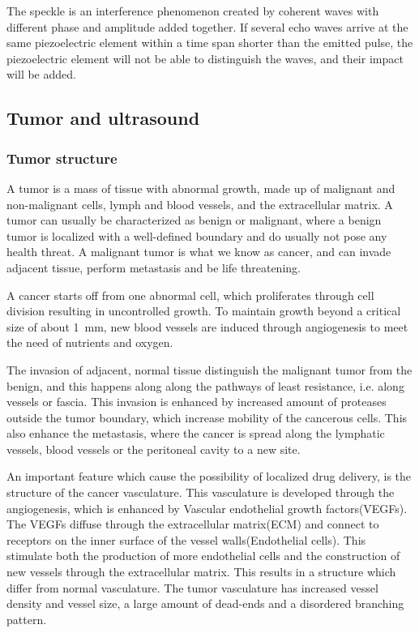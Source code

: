 The speckle is an interference phenomenon created by coherent waves with different phase and amplitude added together. If several echo waves arrive at the same piezoelectric element within a time span shorter than the emitted pulse, the piezoelectric element will not be able to distinguish the waves, and their impact will be added. 

\subsection{Tumor and ultrasound}
\subsubsection{Tumor structure}

 A tumor is a mass of tissue with abnormal growth, made up of malignant and non-malignant cells, lymph and blood vessels, and the extracellular matrix. A tumor can usually be characterized as benign or malignant, where a benign tumor is localized with a well-defined boundary and do usually not pose any health threat. A malignant tumor is what we know as cancer, and can invade adjacent tissue, perform metastasis and be life threatening. 

A cancer starts off from one abnormal cell, which proliferates through cell division resulting in uncontrolled growth. To maintain growth beyond a critical size of about \SI{1}{\milli\metre}\cite{king2006cancer}, new blood vessels are induced through angiogenesis to meet the need of nutrients and oxygen. 

The invasion of adjacent, normal tissue distinguish the malignant tumor from the benign, and this happens along along the pathways of least resistance, i.e. along vessels or fascia. This invasion is enhanced by increased amount of proteases outside the tumor boundary, which increase mobility of the cancerous cells. This also enhance the metastasis, where the cancer is spread along the lymphatic vessels, blood vessels or the peritoneal cavity to a new site.
 
An important feature which cause the possibility of localized drug delivery, is the structure of the cancer vasculature. This vasculature is developed through the angiogenesis, which is enhanced by Vascular endothelial growth factors(VEGFs). The VEGFs diffuse through the extracellular matrix(ECM) and connect to receptors on the inner surface of the vessel walls(Endothelial cells)\cite{Koumoutsakos2013}. This stimulate both the production of more endothelial cells and the construction of new vessels through the extracellular matrix\cite{Nishida2006}. This results in a structure which differ from normal vasculature. The tumor vasculature has increased vessel density and vessel size, a large amount of dead-ends and a disordered branching pattern.    

